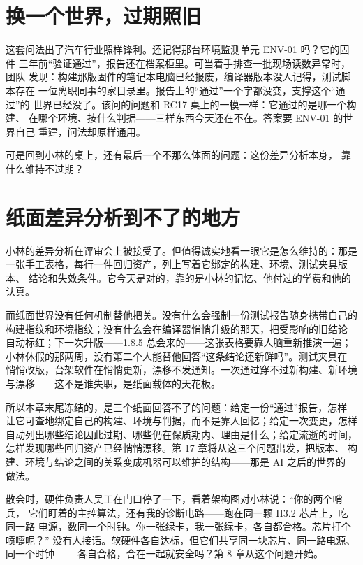 \section{换一个世界，过期照旧}

这套问法出了汽车行业照样锋利。还记得那台环境监测单元 ENV-01 吗？它的固件
三年前“验证通过”，报告还在档案柜里。可当着手排查一批现场读数异常时，团队
发现：构建那版固件的笔记本电脑已经报废，编译器版本没人记得，测试脚本存在
一位离职同事的家目录里。报告上的“通过”一个字都没变，支撑这个“通过”的
世界已经没了。该问的问题和 RC17 桌上的一模一样：它通过的是哪一个构建、
在哪个环境、按什么判据——三样东西今天还在不在。答案要 ENV-01 的世界自己
重建，问法却原样通用。

可是回到小林的桌上，还有最后一个不那么体面的问题：这份差异分析本身，
靠什么维持不过期？

\section{纸面差异分析到不了的地方}

小林的差异分析在评审会上被接受了。但值得诚实地看一眼它是怎么维持的：那是
一张手工表格，每行一件回归资产，列上写着它绑定的构建、环境、测试夹具版本、
结论和失效条件。它今天是对的，靠的是小林的记忆、他付过的学费和他的认真。

而纸面世界没有任何机制替他把关。没有什么会强制一份测试报告随身携带自己的
构建指纹和环境指纹；没有什么会在编译器悄悄升级的那天，把受影响的旧结论
自动标红；下一次升版——1.8.5 总会来的——这张表格要靠人脑重新推演一遍；
小林休假的那两周，没有第二个人能替他回答“这条结论还新鲜吗”。测试夹具在
悄悄改版，台架软件在悄悄更新，漂移不发通知。一次通过穿不过新构建、新环境
与漂移——这不是谁失职，是纸面载体的天花板。

所以本章末尾冻结的，是三个纸面回答不了的问题：给定一份“通过”报告，怎样
让它可查地绑定自己的构建、环境与判据，而不是靠人回忆；给定一次变更，怎样
自动列出哪些结论因此过期、哪些仍在保质期内、理由是什么；给定流逝的时间，
怎样发现哪些回归资产已经悄悄漂移。第 17 章将从这三个问题出发，把版本、
构建、环境与结论之间的关系变成机器可以维护的结构——那是 AI 之后的世界的
做法。

散会时，硬件负责人吴工在门口停了一下，看着架构图对小林说：“你的两个哨兵，
它们盯着的主控算法，还有我的诊断电路——跑在同一颗 H3.2 芯片上，吃同一路
电源，数同一个时钟。你一张绿卡，我一张绿卡，各自都合格。芯片打个喷嚏呢？”
没有人接话。软硬件各自达标，但它们共享同一块芯片、同一路电源、同一个时钟
——各自合格，合在一起就安全吗？第 8 章从这个问题开始。

